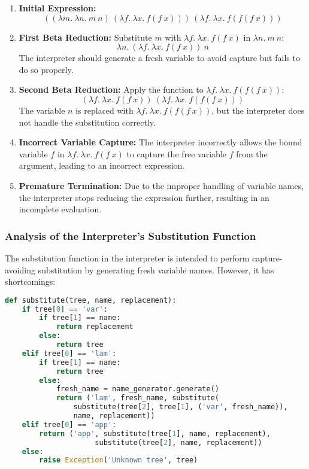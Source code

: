 \documentclass{article}
\begin{document}
\begin{enumerate}
    \item \textbf{Initial Expression:}
    \[
    ((\lambda m.\ \lambda n.\ m\ n)\ (\lambda f.\ \lambda x.\ f(f\ x)))\ (\lambda f.\ \lambda x.\ f(f(f\ x)))
    \]
    
    \item \textbf{First Beta Reduction:} Substitute \(m\) with \(\lambda f.\ \lambda x.\ f(f\ x)\) in \(\lambda n.\ m\ n\):
    \[
    \lambda n.\ (\lambda f.\ \lambda x.\ f(f\ x))\ n
    \]
    The interpreter should generate a fresh variable to avoid capture but fails to do so properly.

    \item \textbf{Second Beta Reduction:} Apply the function to \(\lambda f.\ \lambda x.\ f(f(f\ x))\):
    \[
    (\lambda f.\ \lambda x.\ f(f\ x))\ (\lambda f.\ \lambda x.\ f(f(f\ x)))
    \]
    The variable \(n\) is replaced with \(\lambda f.\ \lambda x.\ f(f(f\ x))\), but the interpreter does not handle the substitution correctly.

    \item \textbf{Incorrect Variable Capture:} The interpreter incorrectly allows the bound variable \(f\) in \(\lambda f.\ \lambda x.\ f(f\ x)\) to capture the free variable \(f\) from the argument, leading to an incorrect expression.

    \item \textbf{Premature Termination:} Due to the improper handling of variable names, the interpreter stops reducing the expression further, resulting in an incomplete evaluation.
\end{enumerate}

\subsubsection*{Analysis of the Interpreter's Substitution Function}

The substitution function in the interpreter is intended to perform capture-avoiding substitution by generating fresh variable names. However, it has shortcomings:

\begin{lstlisting}[language=Python]
def substitute(tree, name, replacement):
    if tree[0] == 'var':
        if tree[1] == name:
            return replacement
        else:
            return tree
    elif tree[0] == 'lam':
        if tree[1] == name:
            return tree
        else:
            fresh_name = name_generator.generate()
            return ('lam', fresh_name, substitute(
                substitute(tree[2], tree[1], ('var', fresh_name)),
                name, replacement))
    elif tree[0] == 'app':
        return ('app', substitute(tree[1], name, replacement),
                     substitute(tree[2], name, replacement))
    else:
        raise Exception('Unknown tree', tree)
\end{lstlisting}
\end{document}
